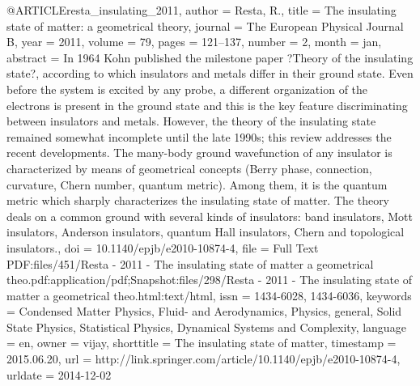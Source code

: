 @ARTICLE{resta_insulating_2011,
  author = {Resta, R.},
  title = {The insulating state of matter: a geometrical theory},
  journal = {The European Physical Journal B},
  year = {2011},
  volume = {79},
  pages = {121--137},
  number = {2},
  month = jan,
  abstract = {In 1964 Kohn published the milestone paper ?Theory of the insulating
	state?, according to which insulators and metals differ in their
	ground state. Even before the system is excited by any probe, a different
	organization of the electrons is present in the ground state and
	this is the key feature discriminating between insulators and metals.
	However, the theory of the insulating state remained somewhat incomplete
	until the late 1990s; this review addresses the recent developments.
	The many-body ground wavefunction of any insulator is characterized
	by means of geometrical concepts (Berry phase, connection, curvature,
	Chern number, quantum metric). Among them, it is the quantum metric
	which sharply characterizes the insulating state of matter. The theory
	deals on a common ground with several kinds of insulators: band insulators,
	Mott insulators, Anderson insulators, quantum Hall insulators, Chern
	and topological insulators.},
  doi = {10.1140/epjb/e2010-10874-4},
  file = {Full Text PDF:files/451/Resta - 2011 - The insulating state of matter a geometrical theo.pdf:application/pdf;Snapshot:files/298/Resta - 2011 - The insulating state of matter a geometrical theo.html:text/html},
  issn = {1434-6028, 1434-6036},
  keywords = {Condensed Matter Physics, Fluid- and Aerodynamics, Physics, general,
	Solid State Physics, Statistical Physics, Dynamical Systems and Complexity},
  language = {en},
  owner = {vijay},
  shorttitle = {The insulating state of matter},
  timestamp = {2015.06.20},
  url = {http://link.springer.com/article/10.1140/epjb/e2010-10874-4},
  urldate = {2014-12-02}
}

